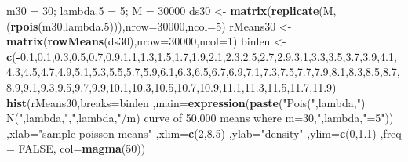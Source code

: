 \documentclass[
]{article}
\newenvironment{Shaded}{\begin{snugshade}}{\end{snugshade}}
\newcommand{\DataTypeTok}[1]{\textcolor[rgb]{0.13,0.29,0.53}{#1}}
\newcommand{\DecValTok}[1]{\textcolor[rgb]{0.00,0.00,0.81}{#1}}
\newcommand{\FloatTok}[1]{\textcolor[rgb]{0.00,0.00,0.81}{#1}}
\newcommand{\KeywordTok}[1]{\textcolor[rgb]{0.13,0.29,0.53}{\textbf{#1}}}
\newcommand{\NormalTok}[1]{#1}
\newcommand{\OperatorTok}[1]{\textcolor[rgb]{0.81,0.36,0.00}{\textbf{#1}}}
\newcommand{\OtherTok}[1]{\textcolor[rgb]{0.56,0.35,0.01}{#1}}
\newcommand{\StringTok}[1]{\textcolor[rgb]{0.31,0.60,0.02}{#1}}
\begin{document}
\begin{Shaded}
\begin{Highlighting}[]
\NormalTok{m30 =}\StringTok{ }\DecValTok{30}\NormalTok{; lambda}\FloatTok{.5}\NormalTok{ =}\StringTok{ }\DecValTok{5}\NormalTok{; M =}\StringTok{ }\DecValTok{30000}
\NormalTok{ds30 <-}\StringTok{ }\KeywordTok{matrix}\NormalTok{(}\KeywordTok{replicate}\NormalTok{(M,(}\KeywordTok{rpois}\NormalTok{(m30,lambda}\FloatTok{.5}\NormalTok{))),}\DataTypeTok{nrow=}\DecValTok{30000}\NormalTok{,}\DataTypeTok{ncol=}\DecValTok{5}\NormalTok{)}
\NormalTok{rMeans30 <-}\StringTok{ }\KeywordTok{matrix}\NormalTok{(}\KeywordTok{rowMeans}\NormalTok{(ds30),}\DataTypeTok{nrow=}\DecValTok{30000}\NormalTok{,}\DataTypeTok{ncol=}\DecValTok{1}\NormalTok{)}
\NormalTok{binlen <-}\StringTok{ }\KeywordTok{c}\NormalTok{(}\OperatorTok{-}\FloatTok{0.1}\NormalTok{,}\FloatTok{0.1}\NormalTok{,}\FloatTok{0.3}\NormalTok{,}\FloatTok{0.5}\NormalTok{,}\FloatTok{0.7}\NormalTok{,}\FloatTok{0.9}\NormalTok{,}\FloatTok{1.1}\NormalTok{,}\FloatTok{1.3}\NormalTok{,}\FloatTok{1.5}\NormalTok{,}\FloatTok{1.7}\NormalTok{,}\FloatTok{1.9}\NormalTok{,}\FloatTok{2.1}\NormalTok{,}\FloatTok{2.3}\NormalTok{,}\FloatTok{2.5}\NormalTok{,}\FloatTok{2.7}\NormalTok{,}\FloatTok{2.9}\NormalTok{,}\FloatTok{3.1}\NormalTok{,}\FloatTok{3.3}\NormalTok{,}\FloatTok{3.5}\NormalTok{,}\FloatTok{3.7}\NormalTok{,}\FloatTok{3.9}\NormalTok{,}\FloatTok{4.1}\NormalTok{,}\FloatTok{4.3}\NormalTok{,}\FloatTok{4.5}\NormalTok{,}\FloatTok{4.7}\NormalTok{,}\FloatTok{4.9}\NormalTok{,}\FloatTok{5.1}\NormalTok{,}\FloatTok{5.3}\NormalTok{,}\FloatTok{5.5}\NormalTok{,}\FloatTok{5.7}\NormalTok{,}\FloatTok{5.9}\NormalTok{,}\FloatTok{6.1}\NormalTok{,}\FloatTok{6.3}\NormalTok{,}\FloatTok{6.5}\NormalTok{,}\FloatTok{6.7}\NormalTok{,}\FloatTok{6.9}\NormalTok{,}\FloatTok{7.1}\NormalTok{,}\FloatTok{7.3}\NormalTok{,}\FloatTok{7.5}\NormalTok{,}\FloatTok{7.7}\NormalTok{,}\FloatTok{7.9}\NormalTok{,}\FloatTok{8.1}\NormalTok{,}\FloatTok{8.3}\NormalTok{,}\FloatTok{8.5}\NormalTok{,}\FloatTok{8.7}\NormalTok{,}\FloatTok{8.9}\NormalTok{,}\FloatTok{9.1}\NormalTok{,}\FloatTok{9.3}\NormalTok{,}\FloatTok{9.5}\NormalTok{,}\FloatTok{9.7}\NormalTok{,}\FloatTok{9.9}\NormalTok{,}\FloatTok{10.1}\NormalTok{,}\FloatTok{10.3}\NormalTok{,}\FloatTok{10.5}\NormalTok{,}\FloatTok{10.7}\NormalTok{,}\FloatTok{10.9}\NormalTok{,}\FloatTok{11.1}\NormalTok{,}\FloatTok{11.3}\NormalTok{,}\FloatTok{11.5}\NormalTok{,}\FloatTok{11.7}\NormalTok{,}\FloatTok{11.9}\NormalTok{)}
\KeywordTok{hist}\NormalTok{(rMeans30,}\DataTypeTok{breaks=}\NormalTok{binlen ,}\DataTypeTok{main=}\KeywordTok{expression}\NormalTok{(}\KeywordTok{paste}\NormalTok{(}\StringTok{"Pois("}\NormalTok{,lambda,}\StringTok{") ~ N("}\NormalTok{,lambda,}\StringTok{","}\NormalTok{,lambda,}\StringTok{"/m) curve of 50,000 means where m=30,"}\NormalTok{,lambda,}\StringTok{"=5"}\NormalTok{))  ,}\DataTypeTok{xlab=}\StringTok{"sample poisson means"}\NormalTok{ ,}\DataTypeTok{xlim=}\KeywordTok{c}\NormalTok{(}\DecValTok{2}\NormalTok{,}\FloatTok{8.5}\NormalTok{) ,}\DataTypeTok{ylab=}\StringTok{"density"}\NormalTok{ ,}\DataTypeTok{ylim=}\KeywordTok{c}\NormalTok{(}\DecValTok{0}\NormalTok{,}\FloatTok{1.1}\NormalTok{) ,}\DataTypeTok{freq =} \OtherTok{FALSE}\NormalTok{, }\DataTypeTok{col=}\KeywordTok{magma}\NormalTok{(}\DecValTok{50}\NormalTok{))}

\end{Highlighting}
\end{Shaded}
\end{document}
